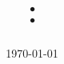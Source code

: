

\documentclass[11pt, a4paper, UTF8]{ctexart}


\title{：}
\me{}{}
\date{\today}


\maketitle
\noplagiarism

\beginthishw
%
\begin{problem}[]

\end{problem}

%

\begin{solution}

\end{solution}

